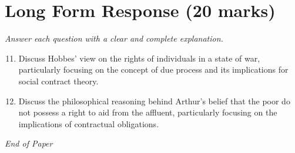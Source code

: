 \documentclass[12pt]{article}
\begin{document}
\section*{Long Form Response (20 marks)}
\textit{Answer each question with a clear and complete explanation.}
\begin{enumerate}[label=\arabic*.]
\setcounter{enumi}{10}
\item Discuss Hobbes' view on the rights of individuals in a state of war, particularly focusing on the concept of due process and its implications for social contract theory.
\item Discuss the philosophical reasoning behind Arthur's belief that the poor do not possess a right to aid from the affluent, particularly focusing on the implications of contractual obligations.
\end{enumerate}

\vfill
\noindent\textit{End of Paper}
\end{document}
